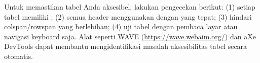 \begin{catatan}
Untuk memastikan tabel Anda aksesibel, lakukan pengecekan berikut: (1) setiap tabel memiliki ; (2) semua header menggunakan  dengan  yang tepat; (3) hindari colspan/rowspan yang berlebihan; (4) uji tabel dengan pembaca layar atau navigasi keyboard saja. Alat seperti WAVE (\url{https://wave.webaim.org/}) dan aXe DevTools dapat membantu mengidentifikasi masalah aksesibilitas tabel secara otomatis.
\end{catatan}

